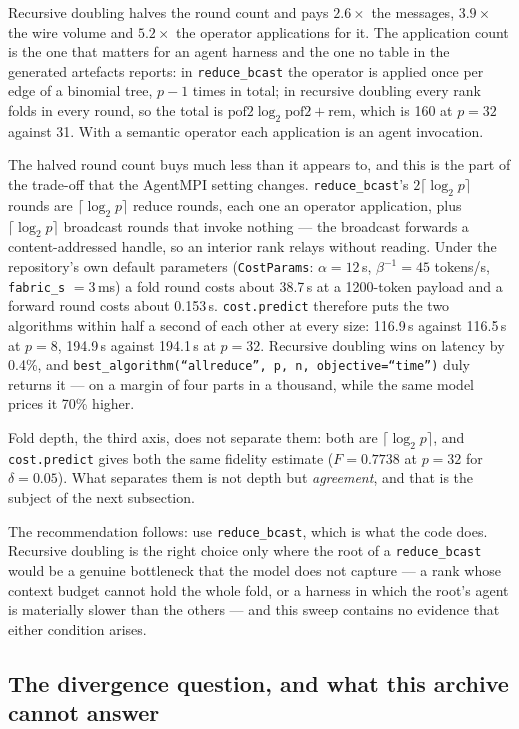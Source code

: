 \documentclass[11pt]{article}
\begin{document}
\noindent
Recursive doubling halves the round count and pays $2.6\times$ the messages, $3.9\times$ the wire
volume and $5.2\times$ the operator applications for it. The application count is the one that
matters for an agent harness and the one no table in the generated artefacts reports: in
\texttt{reduce\_bcast} the operator is applied once per edge of a binomial tree, $p-1$ times in
total; in recursive doubling every rank folds in every round, so the total is
$\mathrm{pof2}\log_2\mathrm{pof2} + \mathrm{rem}$, which is 160 at $p=32$ against 31. With a
semantic operator each application is an agent invocation.

The halved round count buys much less than it appears to, and this is the part of the trade-off
that the AgentMPI setting changes. \texttt{reduce\_bcast}'s $2\lceil\log_2 p\rceil$ rounds are
$\lceil\log_2 p\rceil$ reduce rounds, each one an operator application, plus
$\lceil\log_2 p\rceil$ broadcast rounds that invoke nothing --- the broadcast forwards a
content-addressed handle, so an interior rank relays without reading. Under the repository's own
default parameters (\texttt{CostParams}: $\alpha = 12$\,s, $\beta^{-1} = 45$ tokens/s,
\texttt{fabric\_s} $= 3$\,ms) a fold round costs about 38.7\,s at a 1200-token payload and a
forward round costs about 0.153\,s. \texttt{cost.predict} therefore puts the two algorithms
within half a second of each other at every size: 116.9\,s against 116.5\,s at $p=8$, 194.9\,s
against 194.1\,s at $p=32$. Recursive doubling wins on latency by 0.4\%, and
\texttt{best\_algorithm(``allreduce'', p, n, objective=``time'')} duly returns it --- on a margin
of four parts in a thousand, while the same model prices it 70\% higher.

Fold depth, the third axis, does not separate them: both are $\lceil\log_2 p\rceil$, and
\texttt{cost.predict} gives both the same fidelity estimate ($F = 0.7738$ at $p=32$ for
$\delta = 0.05$). What separates them is not depth but \emph{agreement}, and that is the subject
of the next subsection.

The recommendation follows: use \texttt{reduce\_bcast}, which is what the code does. Recursive
doubling is the right choice only where the root of a \texttt{reduce\_bcast} would be a genuine
bottleneck that the model does not capture --- a rank whose context budget cannot hold the whole
fold, or a harness in which the root's agent is materially slower than the others --- and this
sweep contains no evidence that either condition arises.

\subsection{The divergence question, and what this archive cannot answer}
\end{document}
